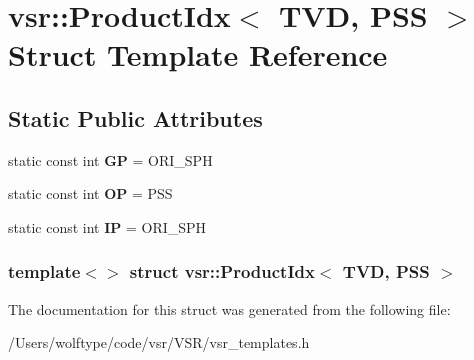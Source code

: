 \hypertarget{structvsr_1_1_product_idx_3_01_t_v_d_00_01_p_s_s_01_4}{\section{vsr\-:\-:Product\-Idx$<$ T\-V\-D, P\-S\-S $>$ Struct Template Reference}
\label{structvsr_1_1_product_idx_3_01_t_v_d_00_01_p_s_s_01_4}
}
\subsection*{Static Public Attributes}
\begin{DoxyCompactItemize}
\item 
\hypertarget{structvsr_1_1_product_idx_3_01_t_v_d_00_01_p_s_s_01_4_a74cf749c8ccc4de5662a323b4894aa62}{static const int {\bfseries G\-P} = O\-R\-I\-\_\-\-S\-P\-H}\label{structvsr_1_1_product_idx_3_01_t_v_d_00_01_p_s_s_01_4_a74cf749c8ccc4de5662a323b4894aa62}

\item 
\hypertarget{structvsr_1_1_product_idx_3_01_t_v_d_00_01_p_s_s_01_4_ae8727cef70e34dfaa1296f301b686f73}{static const int {\bfseries O\-P} = P\-S\-S}\label{structvsr_1_1_product_idx_3_01_t_v_d_00_01_p_s_s_01_4_ae8727cef70e34dfaa1296f301b686f73}

\item 
\hypertarget{structvsr_1_1_product_idx_3_01_t_v_d_00_01_p_s_s_01_4_ab35ee0c072266ec6d2545ed1c99eb523}{static const int {\bfseries I\-P} = O\-R\-I\-\_\-\-S\-P\-H}\label{structvsr_1_1_product_idx_3_01_t_v_d_00_01_p_s_s_01_4_ab35ee0c072266ec6d2545ed1c99eb523}

\end{DoxyCompactItemize}
\subsubsection*{template$<$$>$ struct vsr\-::\-Product\-Idx$<$ T\-V\-D, P\-S\-S $>$}



The documentation for this struct was generated from the following file\-:\begin{DoxyCompactItemize}
\item 
/\-Users/wolftype/code/vsr/\-V\-S\-R/vsr\-\_\-templates.\-h\end{DoxyCompactItemize}
